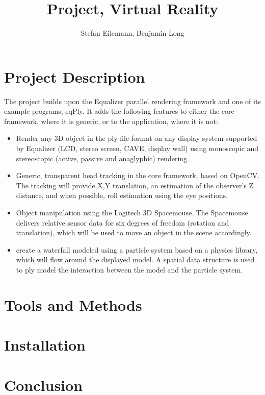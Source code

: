 \documentclass[10pt,a4]{scrartcl}
\title{Project, Virtual Reality}
\author{Stefan Eilemann, Benjamin Long}
\newcommand{\fix}[1]{\textbf{\color{red}{#1}}}
\begin{document}
\maketitle

\section{Project Description}

The project builds upon the Equalizer parallel rendering framework and one of
its example programs, eqPly. It adds the following features to either the
core framework, where it is generic, or to the application, where it is not:
\begin{itemize}
\item Render any 3D object in the ply file format on any display system
  supported by Equalizer (LCD, stereo screen, CAVE, display wall) using
  monoscopic and stereoscopic (active, passive and anaglyphic) rendering.
\item Generic, transparent head tracking in the core framework, based on
  OpenCV. The tracking will provide X,Y translation, an estimation of the
  observer's Z distance, and when possible, roll estimation using the eye
  positions.
\item Object manipulation using the Logitech 3D Spacemouse. The Spacemouse
  delivers relative sensor data for six degrees of freedom (rotation and
  translation), which will be used to move an object in the scene accordingly.
\item create a waterfall modeled using a particle system based on a physics
  library, which will flow around the displayed model. A spatial data structure
  is used to ply model the interaction between the model and the particle
  system.
\end{itemize}

\fix{screenshots}

\section{Tools and Methods}

\fix{How the 3D scene was built and which tools were used. Libraries used for
  the head tracking, fiducial marker tracking, physics simulation and any
  additional feature.}

\section{Installation}
\fix{Share your experience. What were the difficulties? What you liked and/or
  disliked while developing this project? What you have learned?}

\section{Conclusion}
\end{document}
